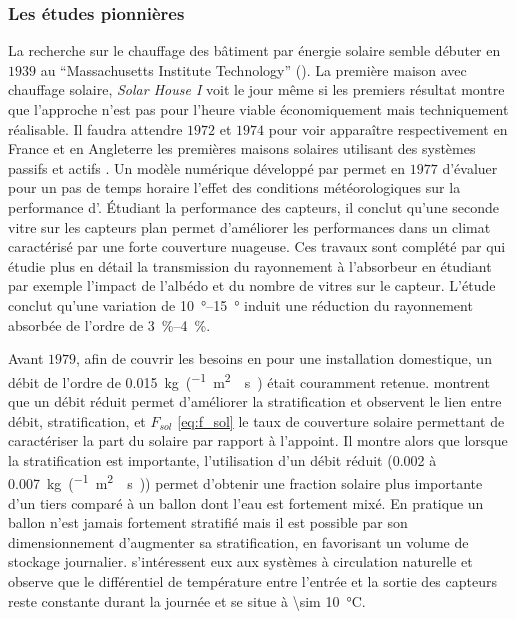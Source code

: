 \subsubsection{Les études pionnières} %
\label{ssub:les_etudes_pionnieres}
La recherche sur le chauffage des bâtiment par énergie solaire semble débuter en $1939$ au
\enquote{Massachusetts Institute Technology} (). La première maison avec
chauffage solaire, 
{\textit{Solar House I}} voit le jour même si les premiers résultat
montre que l’approche n’est pas pour l’heure viable économiquement mais techniquement
réalisable. Il faudra attendre $1972$ et $1974$ pour voir apparaître respectivement
en France et en Angleterre les premières maisons solaires utilisant des systèmes passifs
et actifs \parencite{Michaelides1993}. Un modèle numérique développé par \textcite{Hunn197733}
permet en $1977$ d’évaluer pour un pas de temps horaire l’effet des conditions
météorologiques sur la performance d’. Étudiant la performance des capteurs, il
conclut qu’une seconde vitre sur les capteurs plan permet d’améliorer les performances
dans un climat caractérisé par une forte couverture nuageuse. Ces travaux sont complété
par \textcite{Elsayed198989} qui étudie plus en détail la transmission du rayonnement à
l’absorbeur en étudiant par exemple l’impact de l’albédo et du nombre de vitres sur le
capteur. L’étude conclut qu’une variation de \SIrange{10}{15}{\degree} induit une
réduction du rayonnement absorbée de l’ordre de \SIrange{3}{4}{\percent}.

Avant $1979$, afin de couvrir les besoins en  pour une installation domestique,
un débit de l’ordre de \SI{0.015}{kg\per(\metre\squared\period\second)}
était couramment retenue. \textcite{Koppen1979} montrent que un débit réduit
permet d’améliorer la stratification et \textcite{Wuestling1985}
observent le lien entre débit, stratification, et $F_{sol}$ \eqref{eq:f_sol} le taux de couverture
solaire permettant de caractériser la part du solaire par rapport à l’appoint.
Il montre alors que lorsque la stratification est importante,
l’utilisation d’un débit réduit (\num{0.002} à \SI{0.007}{kg\per(\metre\squared\period\second)}) permet
d’obtenir une fraction solaire plus importante d’un tiers comparé à un ballon dont
l’eau est fortement mixé. En pratique un ballon n’est jamais fortement stratifié mais il est possible par son dimensionnement
d’augmenter sa stratification, en favorisant un volume de stockage journalier. \textcite{Loef1967}
s’intéressent eux aux systèmes à circulation naturelle et observe que le différentiel
de température entre l’entrée et la sortie des capteurs reste constante durant la journée
et se situe à \SI{\sim 10}{\celsius}.

